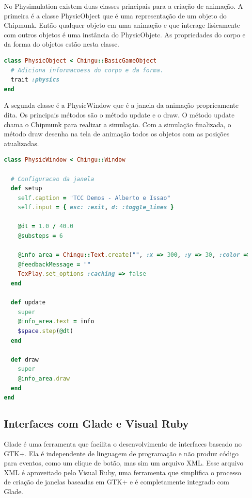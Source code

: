 No Physimulation existem duas classes principais para a criação de animação. A primeira é a classe PhysicObject que é uma representação de um objeto do
Chipmunk. Então qualquer objeto em uma animação e que interage fisicamente com outros objetos é uma instância do PhysicObjetc. As propriedades do corpo e da 
forma do objetos estão nesta classe.

\begin{lstlisting}[language=Ruby, caption=physics.rb]
class PhysicObject < Chingu::BasicGameObject
  # Adiciona informacoess do corpo e da forma.
  trait :physics
end
\end{lstlisting}

A segunda classe é a PhysicWindow que é a janela da animação proprieamente dita.
Os principais métodos são o método update e o draw. O método update chama o Chipmunk para realizar a simulação. Com a simulação finalizada, o método draw
desenha na tela de animação todos os objetos com as posições atualizadas. 

\begin{lstlisting}[language=Ruby, caption=physics.rb]
class PhysicWindow < Chingu::Window

  # Configuracao da janela
  def setup
    self.caption = "TCC Demos - Alberto e Issao"
    self.input = { esc: :exit, d: :toggle_lines }

    @dt = 1.0 / 40.0
    @substeps = 6

    @info_area = Chingu::Text.create("", :x => 300, :y => 30, :color => Gosu::Color::YELLOW)    
    @feedbackMessage = ""
    TexPlay.set_options :caching => false
  end

  def update
    super
    @info_area.text = info
    $space.step(@dt)
  end

  def draw
    super
    @info_area.draw
  end
end
\end{lstlisting}

\subsection{Interfaces com Glade e Visual Ruby}
Glade é uma ferramenta que facilita o desenvolvimento de interfaces baseado no GTK+. Ela é independente de linguagem de programação
e não produz código para eventos, como um clique de botão, mas sim um arquivo XML. Esse arquivo XML é aproveitado pelo Visual Ruby, uma ferramenta que simplifica 
o processo de criação de janelas baseadas em GTK+ e é completamente integrado com Glade.

